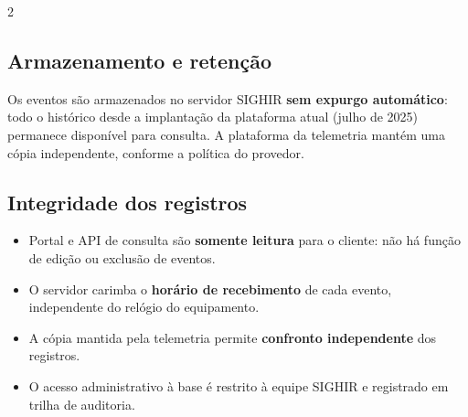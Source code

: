 \documentclass[a4paper,10pt]{article}
\begin{document}
\begin{multicols}{2}
\subsection{Armazenamento e retenção}
Os eventos são armazenados no servidor SIGHIR \textbf{sem expurgo automático}: todo o histórico
desde a implantação da plataforma atual (julho de 2025) permanece disponível para consulta. A
plataforma da telemetria mantém uma cópia independente, conforme a política do provedor.

\subsection{Integridade dos registros}
\begin{itemize}
  \item Portal e API de consulta são \textbf{somente leitura} para o cliente: não há função de edição ou exclusão de eventos.
  \item O servidor carimba o \textbf{horário de recebimento} de cada evento, independente do relógio do equipamento.
  \item A cópia mantida pela telemetria permite \textbf{confronto independente} dos registros.
  \item O acesso administrativo à base é restrito à equipe SIGHIR e registrado em trilha de auditoria.
\end{itemize}

\end{multicols}
\end{document}
